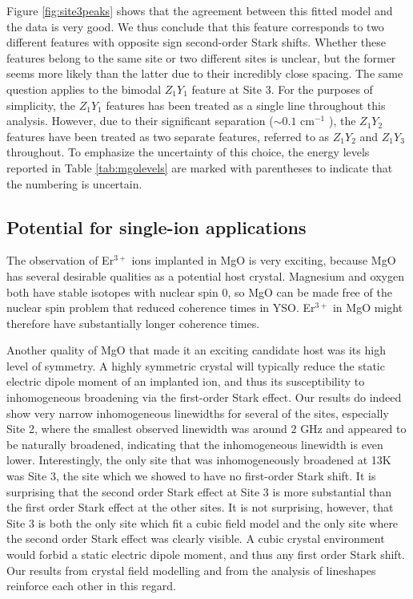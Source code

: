 \documentclass[12pt]{report}
\newcommand{\erbium}[1][ ]{Er$^{3+}$#1}
\newcommand{\wn}[1][ ]{cm$^{-1}$#1}
\begin{document}
Figure \ref{fig:site3peaks} shows that the agreement between this fitted model and the data is very good. We thus conclude that this feature corresponds to two different features with opposite sign second-order Stark shifts. Whether these features belong to the same site or two different sites is unclear, but the former seems more likely than the latter due to their incredibly close spacing. The same question applies to the bimodal $Z_{1}Y_{1}$ feature at Site 3. For the purposes of simplicity, the $Z_{1}Y_{1}$ features has been treated as a single line throughout this analysis. However, due to their significant separation ($\sim 0.1$ \wn), the $Z_{1}Y_{2}$ features have been treated as two separate features, referred to as $Z_{1}Y_{2}$ and $Z_{1}Y_{3}$ throughout. To emphasize the uncertainty of this choice, the energy levels reported in Table \ref{tab:mgolevels} are marked with parentheses to indicate that the numbering is uncertain.

\subsection{Potential for single-ion applications}
The observation of \erbium ions implanted in MgO is very exciting, because MgO has several desirable qualities as a potential host crystal. Magnesium and oxygen both have stable isotopes with nuclear spin 0, so MgO can be made free of the nuclear spin problem that reduced coherence times in YSO. \erbium in MgO might therefore have substantially longer coherence times.

Another quality of MgO that made it an exciting candidate host was its high level of symmetry. A highly symmetric crystal will typically reduce the static electric dipole moment of an implanted ion, and thus its susceptibility to inhomogeneous broadening via the first-order Stark effect. Our results do indeed show very narrow inhomogeneous linewidths for several of the sites, especially Site 2, where the smallest observed linewidth was around $2$ GHz and appeared to be naturally broadened, indicating that the inhomogeneous linewidth is even lower. Interestingly, the only site that was inhomogeneously broadened at 13K was Site 3, the site which we showed to have no first-order Stark shift. It is surprising that the second order Stark effect at Site 3 is more substantial than the first order Stark effect at the other sites. It is not surprising, however, that Site 3 is both the only site which fit a cubic field model and the only site where the second order Stark effect was clearly visible. A cubic crystal environment would forbid a static electric dipole moment, and thus any first order Stark shift. Our results from crystal field modelling and from the analysis of lineshapes reinforce each other in this regard.
\end{document}
